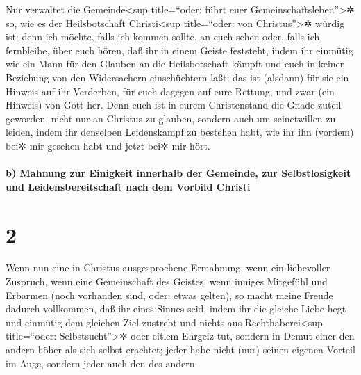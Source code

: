  Nur verwaltet die Gemeinde\textless sup title=``oder:
führt euer Gemeinschaftsleben''\textgreater✲ so, wie es der
Heilsbotschaft Christi\textless sup title=``oder: von
Christus''\textgreater✲ würdig ist; denn ich möchte, falls ich kommen
sollte, an euch sehen oder, falls ich fernbleibe, über euch hören, daß
ihr in einem Geiste feststeht, indem ihr einmütig wie ein Mann für den
Glauben an die Heilsbotschaft kämpft  und euch in keiner
Beziehung von den Widersachern einschüchtern laßt; das ist (alsdann) für
sie ein Hinweis auf ihr Verderben, für euch dagegen auf eure Rettung,
und zwar (ein Hinweis) von Gott her.  Denn euch ist in
eurem Christenstand die Gnade zuteil geworden, nicht nur an Christus zu
glauben, sondern auch um seinetwillen zu leiden,  indem
ihr denselben Leidenskampf zu bestehen habt, wie ihr ihn (vordem) bei✲
mir gesehen habt und jetzt bei✲ mir hört.

\hypertarget{b-mahnung-zur-einigkeit-innerhalb-der-gemeinde-zur-selbstlosigkeit-und-leidensbereitschaft-nach-dem-vorbild-christi}{%
\paragraph{b) Mahnung zur Einigkeit innerhalb der Gemeinde, zur
Selbstlosigkeit und Leidensbereitschaft nach dem Vorbild
Christi}\label{b-mahnung-zur-einigkeit-innerhalb-der-gemeinde-zur-selbstlosigkeit-und-leidensbereitschaft-nach-dem-vorbild-christi}}

\hypertarget{section-1}{%
\section{2}\label{section-1}}

 Wenn nun eine in Christus ausgesprochene Ermahnung, wenn
ein liebevoller Zuspruch, wenn eine Gemeinschaft des Geistes, wenn
inniges Mitgefühl und Erbarmen (noch vorhanden sind, oder: etwas
gelten),  so macht meine Freude dadurch vollkommen, daß
ihr eines Sinnes seid, indem ihr die gleiche Liebe hegt und einmütig dem
gleichen Ziel zustrebt  und nichts aus
Rechthaberei\textless sup title=``oder: Selbstsucht''\textgreater✲ oder
eitlem Ehrgeiz tut, sondern in Demut einer den andern höher als sich
selbst erachtet;  jeder habe nicht (nur) seinen eigenen
Vorteil im Auge, sondern jeder auch den des andern.

